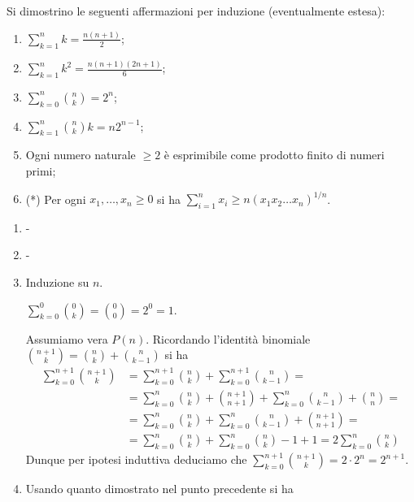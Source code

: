 \documentclass[a4paper]{article}\par \usepackage{style}\par
\begin{document}
\begin{es}
  Si dimostrino le seguenti affermazioni per induzione (eventualmente estesa):
  \begin{enumerate}
  \item $ \sum_{k = 1}^{n} k = \frac{n(n + 1)}{2} $;
  \item $ \sum_{k = 1}^{n} k^2 = \frac{n(n + 1)(2n + 1)}{6} $;
  \item $ \sum_{k = 0}^{n} \binom{n}{k} = 2^n $;
  \item $ \sum_{k = 1}^{n} \binom{n}{k} k = n 2^{n-1} $;
  \item Ogni numero naturale $ \geq 2 $ è esprimibile come prodotto finito di numeri primi;
  \item (*) Per ogni $ x_1, \dots, x_n \geq 0 $ si ha $ \sum_{i = 1}^{n} x_i \geq n(x_1 x_2 \dots x_n)^{1/n} $.
  \end{enumerate}
\end{es}\par \begin{enumerate}
\item -
\item -
\item Induzione su $ n $.
  \begin{pbase}
    $ \sum_{k = 0}^{0} \binom{0}{k} = \binom{0}{0} = 2^0 = 1 $.
  \end{pbase}
  \begin{pind}
    Assumiamo vera $ P(n) $. Ricordando l'identità binomiale $ \binom{n + 1}{k} = \binom{n}{k} + \binom{n}{k - 1} $ si ha
    \begin{align*}
      \sum_{k = 0}^{n + 1} \binom{n + 1}{k} & = \sum_{k = 0}^{n + 1} \binom{n}{k} + \sum_{k = 0}^{n + 1} \binom{n}{k - 1} = \\
                                            & = \sum_{k = 0}^{n} \binom{n}{k} + \binom{n + 1}{n + 1} + \sum_{k = 0}^{n} \binom{n}{k - 1} + \binom{n}{n} = \\
                                            & = \sum_{k = 0}^{n} \binom{n}{k} + \sum_{k = 0}^{n} \binom{n}{k - 1} + \binom{n + 1}{n + 1} = \\
                                            & = \sum_{k = 0}^{n} \binom{n}{k} + \sum_{k = 0}^{n} \binom{n}{k} - 1 + 1 = 2 \sum_{k = 0}^{n} \binom{n}{k}
    \end{align*}
    Dunque per ipotesi induttiva deduciamo che $ \sum_{k = 0}^{n + 1} \binom{n + 1}{k} = 2 \cdot 2^{n} = 2^{n + 1} $.
  \end{pind}
\item Usando quanto dimostrato nel punto precedente si ha

\end{enumerate}
\end{document}
